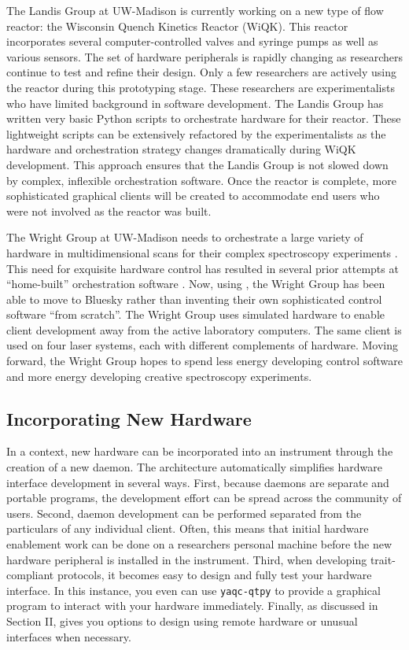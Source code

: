 The Landis Group at UW-Madison is currently working on a new type of flow reactor: the Wisconsin Quench Kinetics Reactor (WiQK).
This reactor incorporates several computer-controlled valves and syringe pumps as well as various sensors.
The set of hardware peripherals is rapidly changing as researchers continue to test and refine their design.
Only a few researchers are actively using the reactor during this prototyping stage.
These researchers are experimentalists who have limited background in software development.
The Landis Group has written very basic Python scripts to orchestrate hardware for their reactor.
These lightweight scripts can be extensively refactored by the experimentalists as the hardware and orchestration strategy changes dramatically during WiQK development.
This approach ensures that the Landis Group is not slowed down by complex, inflexible orchestration software.
Once the reactor is complete, more sophisticated graphical clients will be created to accommodate end users who were not involved as the reactor was built.

The Wright Group at UW-Madison needs to orchestrate a large variety of hardware in multidimensional scans for their complex spectroscopy experiments \cite{MukamelShaul2000a, WrightJohnCurtis2011a}.
This need for exquisite hardware control has resulted in several prior attempts at ``home-built'' orchestration software \cite{CarlsonRogerJohn1988a, MeyerKentAlbert2004b, KainSchuyler2017a, ThompsonBlaiseJonathan2018a}.
Now, using \yaq{}, the Wright Group has been able to move to Bluesky rather than inventing their own sophisticated control software ``from scratch''.
The Wright Group uses simulated hardware to enable client development away from the active laboratory computers.
The same client is used on four laser systems, each with different complements of hardware.
Moving forward, the Wright Group hopes to spend less energy developing control software and more energy developing creative spectroscopy experiments.



\subsection{Incorporating New Hardware}

In a \yaq{} context, new hardware can be incorporated into an instrument through the creation of a new daemon.
The \yaq{} architecture automatically simplifies hardware interface development in several ways.
First, because daemons are separate and portable programs, the development effort can be spread across the community of \yaq{} users.
Second, \yaq{} daemon development can be performed separated from the particulars of any individual client.
Often, this means that initial hardware enablement work can be done on a researchers personal machine before the new hardware peripheral is installed in the instrument.
Third, when developing trait-compliant protocols, it becomes easy to design and fully test your hardware interface.
In this instance, you even can use \texttt{yaqc-qtpy} to provide a graphical program to interact with your hardware immediately.
Finally, as discussed in Section II, \yaq{} gives you options to design using remote hardware or unusual interfaces when necessary.

